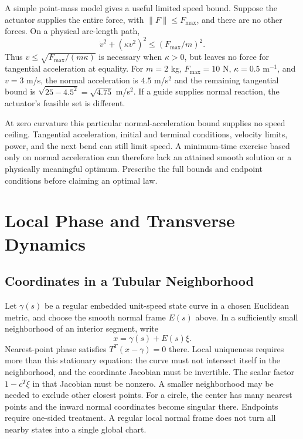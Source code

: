 \documentclass[12pt, openany]{book}
\theoremstyle{plain}
\begin{document}
A simple point-mass model gives a useful limited speed bound. Suppose the
actuator supplies the entire force, with $\|F\|\le F_{\max}$, and there are
no other forces. On a physical arc-length path,
\begin{equation}
 \dot v^2+(\kappa v^2)^2\le(F_{\max}/m)^2.
\end{equation}
Thus $v\le\sqrt{F_{\max}/(m\kappa)}$ is necessary when $\kappa>0$, but leaves
no force for tangential acceleration at equality. For $m=2$ kg,
$F_{\max}=10$ N, $\kappa=0.5$ m$^{-1}$, and $v=3$ m/s, the normal
acceleration is $4.5$ m/s$^2$ and the remaining tangential bound is
$\sqrt{25-4.5^2}=\sqrt{4.75}$ m/s$^2$. If a guide supplies normal reaction,
the actuator's feasible set is different.

At zero curvature this particular normal-acceleration bound supplies no
speed ceiling. Tangential acceleration, initial and terminal conditions,
velocity limits, power, and the next bend can still limit speed. A
minimum-time exercise based only on normal acceleration can therefore lack
an attained smooth solution or a physically meaningful optimum. Prescribe
the full bounds and endpoint conditions before claiming an optimal law.

\section{Local Phase and Transverse Dynamics}

\subsection{Coordinates in a Tubular Neighborhood}

Let $\gamma(s)$ be a regular embedded unit-speed state curve in a chosen
Euclidean metric, and choose the smooth normal frame $E(s)$ above. In a
sufficiently small neighborhood of an interior segment, write
\begin{equation}\label{eq:frenet_coords}
 x=\gamma(s)+E(s)\xi.
\end{equation}
Nearest-point phase satisfies $T^T(x-\gamma)=0$ there. Local uniqueness
requires more than this stationary equation: the curve must not intersect
itself in the neighborhood, and the coordinate Jacobian must be invertible.
The scalar factor $1-c^T\xi$ in that Jacobian must be nonzero. A smaller
neighborhood may be needed to exclude other closest points. For a circle,
the center has many nearest points and the inward normal coordinates become
singular there. Endpoints require one-sided treatment. A regular local
normal frame does not turn all nearby states into a single global chart.
\end{document}
